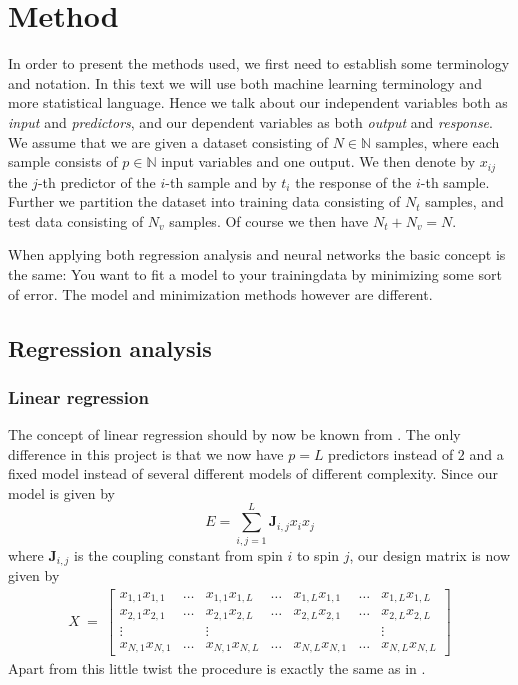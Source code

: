 \documentclass[a4paper,english]{article}
\begin{document}
\section{Method}
In order to present the methods used, 
we first need to establish some terminology and notation. 
In this text we will use both machine learning terminology and more 
statistical language. Hence we talk about our independent variables both
as \textit{input} and \textit{predictors}, and our dependent 
variables as both \textit{output} and \textit{response}.
We assume that we are given a dataset consisting of 
$N \in \mathbb{N}$ samples, where each sample consists of $p\in\mathbb{N}$ 
input variables
and one output. We then denote by $x_{ij}$ the $j$-th predictor of
the $i$-th sample and by $t_i$ the response of the $i$-th sample. 
Further we partition the dataset into training data consisting of
$N_t$ samples, and test data consisting of $N_v$ samples. Of course we
then have $N_t + N_v = N$.
\par
When applying both regression analysis and neural 
networks the basic concept is the same:
You want to fit a model to your trainingdata by minimizing some sort of 
error. The model and minimization methods however are different.

\subsection{Regression analysis}
\subsubsection{Linear regression}
The concept of linear regression should by now be known from 
\cite{baarravndal}. 
The only difference in this project is that we now have $p=L$ predictors 
instead of $2$ and a fixed model instead of several different models
of different complexity. Since our model is given by
\begin{equation}
    E = \sum_{i,j=1}^L \bm{J}_{i,j} x_i x_j
\end{equation}
where $\bm{J}_{i,j}$ is the coupling constant from spin $i$ to spin $j$,
our design matrix is now given by
\begin{equation}\begin{split}
    X \ = \
    \begin{bmatrix}
        x_{1,1}x_{1,1} &\dots &x_{1,1} x_{1,L}
        &\dots
        &x_{1,L}x_{1,1}  &\dots &x_{1,L} x_{1,L} \\
        x_{2,1}x_{2,1}  &\dots &x_{2,1} x_{2,L}
        &\dots
        &x_{2,L}x_{2,1} &\dots &x_{2,L} x_{2,L} \\
        \vdots &&\vdots &&&&\vdots\\ 
        x_{N,1}x_{N,1} &\dots &x_{N,1} x_{N,L}
        &\dots
        &x_{N,L}x_{N,1} &\dots &x_{N,L} x_{N,L}
    \end{bmatrix}
\end{split}\end{equation}
Apart from this little twist the procedure is exactly the same as in 
\cite{baarravndal}.
\end{document}
